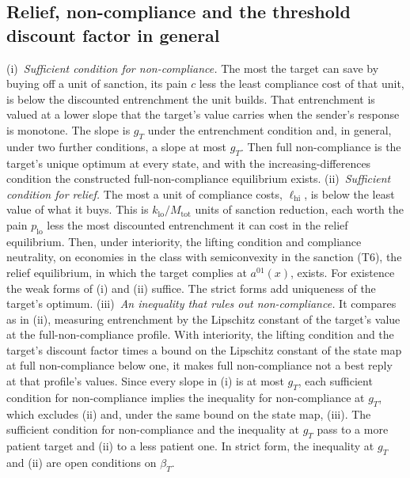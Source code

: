 \subsection{Relief, non-compliance and the threshold discount factor in general}
\label{sec:moved-main-2026-10-13:bracket}

(i)~\emph{Sufficient condition for non-compliance.} The most the target can save by buying
off a unit of sanction, its pain $c$ less the least compliance cost of that
unit, is below the discounted entrenchment the unit builds. That entrenchment is valued at a lower
slope that the target's value carries when the sender's response is monotone.
The slope is $g_T$ under the entrenchment condition and, in general, under two further
conditions, a slope at most $g_T$. Then full non-compliance is the target's unique
optimum at every state, and with the increasing-differences condition the
constructed full-non-compliance equilibrium exists. (ii)~\emph{Sufficient condition
for relief.} The most a unit of compliance costs, $\ell_{\mathrm{hi}}$, is below
the least value of what it buys. This is $k_{\mathrm{lo}}/M_{\mathrm{tot}}$ units of
sanction reduction, each worth the pain $p_{\mathrm{lo}}$ less the most
discounted entrenchment it can cost in the relief equilibrium. Then, under
interiority, the lifting condition and compliance neutrality, on economies in the class
with semiconvexity in the sanction \textup{(T6)}, the relief equilibrium, in
which the target complies at $a^{01}(x)$, exists. For existence the weak forms of
(i) and (ii) suffice. The strict forms add uniqueness of the target's optimum.
(iii)~\emph{An inequality that rules out non-compliance.} It compares as in (ii),
measuring entrenchment by the Lipschitz constant of the target's value at the
full-non-compliance profile. With interiority, the lifting condition and the target's discount
factor times a bound on the Lipschitz constant of the state map at full
non-compliance below one, it makes full non-compliance not a best reply at that profile's
values. Since every slope in (i) is at most $g_T$, each sufficient condition for
non-compliance implies the inequality for non-compliance at $g_T$, which excludes (ii) and,
under the same bound on the state map, (iii). The sufficient condition for
non-compliance and the inequality at $g_T$ pass to a more patient target and (ii) to a
less patient one. In strict form, the inequality at $g_T$ and (ii) are open
conditions on $\beta_T$.

